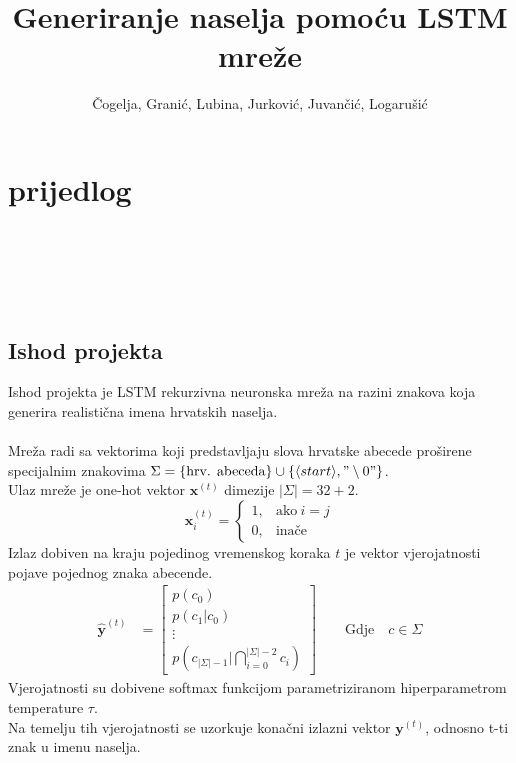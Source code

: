 \documentclass{report}
\title{Generiranje naselja pomoću LSTM mreže}
\author{Čogelja, Granić, Lubina, Jurković, Juvančić, Logarušić}
\begin{document}
\maketitle

\chapter*{prijedlog}
\ \\
\\
\\
\\

\section{Ishod projekta}
Ishod projekta je LSTM rekurzivna neuronska mreža na razini znakova koja generira realistična imena hrvatskih naselja.\\
\\
Mreža radi sa vektorima koji predstavljaju slova hrvatske abecede proširene specijalnim znakovima $\Sigma = \{ \text{hrv. abeceda}\} \cup \{\langle start \rangle, "\setminus 0"\}$.\\
Ulaz mreže je one-hot vektor $\mathbf{x}^{(t)}$ dimezije $\lvert \Sigma \rvert = 32 + 2$.
\begin{equation}
\mathbf{x}^{(t)}_i=
    \begin{cases}
      1, & \text{ako}\ i=j \\
      0, & \text{inače}
    \end{cases}
\end{equation}
Izlaz dobiven na kraju pojedinog vremenskog koraka $t$ je vektor vjerojatnosti pojave pojednog znaka abecende.\\
\begin{align}
    \hat{\mathbf{y}}^{(t)} &= \begin{bmatrix}
           p(c_0) \\
           p(c_1 | c_0) \\
           \vdots \\
           p(c_{\lvert \Sigma \rvert -1} | \bigcap_{i=0}^{\lvert \Sigma \rvert -2} c_i)
         \end{bmatrix}
         \quad \quad \text{Gdje} \quad c \in \Sigma
\end{align}
Vjerojatnosti su dobivene softmax funkcijom parametriziranom hiperparametrom temperature $\tau$.\\
Na temelju tih vjerojatnosti se uzorkuje konačni izlazni vektor $\mathbf{y}^{(t)}$, odnosno t-ti znak u imenu naselja.\\
\end{document}
